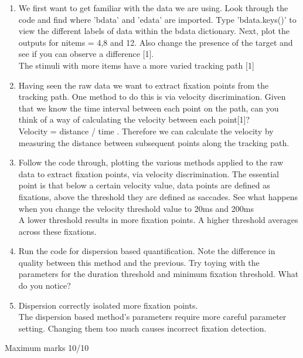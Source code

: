 \documentclass[12pt,english]{scrartcl}
\begin{document}
\begin{enumerate}
\item We first want to get familiar with the data we are using. Look through the code and find where 'bdata' and 'edata' are imported. Type 'bdata.keys()' to view the different labels of data within the bdata dictionary. Next, plot the outputs for nitems = 4,8 and 12. Also change the presence of the target and see if you can observe a difference [1]. \\

 \color{blue}
 The stimuli with more items have a more varied tracking path [1] 
 
 \color{black}
 \item Having seen the raw data we want to extract fixation points from the tracking path. One method to do this is via velocity discrimination. Given that we know the time interval between each point on the path, can you think of a way of calculating the velocity between each point[1]? \\
 
 \color{blue}
 Velocity = distance / time . Therefore we can calculate the velocity by measuring the distance between subsequent points along the tracking path. \\
 
 \color{black}
 \item Follow the code through, plotting the various methods applied to the raw data to extract fixation points, via velocity discrimination. The essential point is that below a certain velocity value, data points are defined as fixations, above the threshold they are defined as saccades. See what happens when you change the velocity threshold value to 20ms and 200ms\\
 
 \color{blue}
 A lower threshold results in more fixation points. A higher threshold averages across these fixations. \\
 
 \color{black}
 \item Run the code for dispersion based quantification. Note the difference in quality between this method and the previous. Try toying with the parameters for the duration threshold and minimum fixation threshold. What do you notice? \\
 \item[]
 \color{blue}
 Dispersion correctly isolated more fixation points. \\
 
 The dispersion based method's parameters require more careful parameter setting. Changing them too much causes incorrect fixation detection.
  

 \end{enumerate}
 \color{black}
 Maximum marks 10/10 \\
\end{document}
